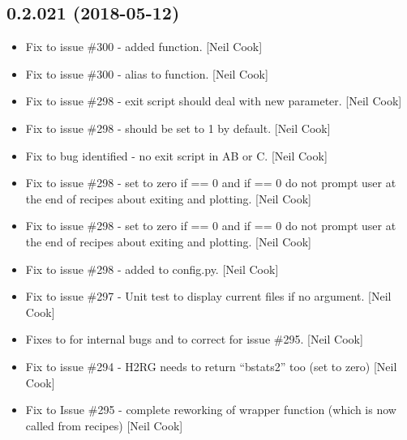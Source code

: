 \documentclass[a4paper,10pt,english]{report}
\begin{document}
\subsection{0.2.021 (2018-05-12)}
\label{\detokenize{misc/changelog:id439}}\begin{itemize}
\item {} 
Fix to issue \#300 - added  function. {[}Neil Cook{]}

\item {} 
Fix to issue \#300 - alias to  function. {[}Neil Cook{]}

\item {} 
Fix to issue \#298 - exit script should deal with new 
parameter. {[}Neil Cook{]}

\item {} 
Fix to issue \#298 -  should be set to 1 by default.
{[}Neil Cook{]}

\item {} 
Fix to bug identified - no exit script in AB or C. {[}Neil Cook{]}

\item {} 
Fix to issue \#298 - set  to zero if  == 0 and
if  == 0 do not prompt user at the end of recipes about
exiting and plotting. {[}Neil Cook{]}

\item {} 
Fix to issue \#298 - set  to zero if  == 0 and
if  == 0 do not prompt user at the end of recipes about
exiting and plotting. {[}Neil Cook{]}

\item {} 
Fix to issue \#298 - added  to config.py. {[}Neil Cook{]}

\item {} 
Fix to issue \#297 - Unit test to display current files if no argument.
{[}Neil Cook{]}

\item {} 
Fixes to  for internal bugs and to correct for issue \#295.
{[}Neil Cook{]}

\item {} 
Fix to issue \#294 - H2RG needs to return “bstats2” too (set to zero)
{[}Neil Cook{]}

\item {} 
Fix to Issue \#295 - complete reworking of wrapper function (which is
now called from recipes) {[}Neil Cook{]}


\end{itemize}
\end{document}
